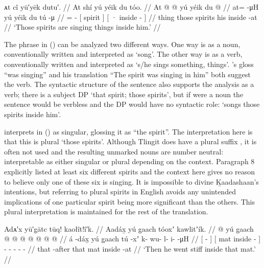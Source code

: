 \ex\label{ex:100-175-spirits-singing}%
%
\begingl
	\glpreamble	ᴀt cî yū′yēk dutu′. //
	\glpreamble	At shí yú yéik du tóo. //
	\gla	At @  @ {}
		{} yú yéik {}
		{} du  @ {} {} //
	\glb	at=  -μH
		{} yú yéik {} 
		{} du tú -μ {} //
	\glc	{}=  -\hspace{2em}
		{}[  spirit {}]
		{}[ · inside - {}] //
	\gld	thing  {}
		{} those spirits {}
		{} his inside -at {} //
	\glft	‘Those spirits are singing things inside him.’
		//
\endgl
\xe

The phrase  in (\lastx) can be analyzed two different ways.
One way is as a noun, conventionally written  and interpreted as ‘song’.
The other way is as a verb, conventionally written  and interpreted as ‘s/he sings something, things’.
\citeauthor{swanton:1909}’s gloss “was singing” and his translation “The spirit was singing in him” both suggest the verb.
The syntactic structure of the sentence also supports the analysis as a verb; there is a subject DP  ‘that spirit; those spirits’, but if  were a noun the sentence would be verbless and the DP would have no syntactic role: ‘songs those spirits inside him’.

\citeauthor{swanton:1909} interprets  in (\lastx) as singular, glossing it as “the spirit”.
The interpretation here is that this is plural ‘those spirits’.
Although Tlingit does have a plural suffix , it is often not used and the resulting unmarked nouns are number neutral: interpretable as either singular or plural depending on the context.
Paragraph 8 explicitly listed at least six different spirits and the context here gives no reason to believe only one of these six is singing.
It is impossible to divine Ḵaadashaan’s intentions, but referring to plural spirits in English avoids any unintended implications of one particular spirit being more significant than the others.
This plural interpretation is maintained for the rest of the translation. 

\ex\label{ex:100-176-went-stiff}%
%
\begingl
	\glpreamble	Adᴀ′x yū′g̣ātc tūq! kaołît!î′k. //
	\glpreamble	Aadáx̱ yú g̱aach tóoxʼ kawlitʼík. //
	\gla	{}  @ {} {}
		{} yú g̱aach  @ {} {}
		 @ {} @ {} @ {} @ {} @ {} @ {} //
	\glb	{} á -dáx̱ {}
		{} yú g̱aach tú -xʼ {} 
		k- wu- l- i-  -μH //
	\glc	{}[  - {}]
		{}[  mat inside - {}]
		- - - -  - //
	\gld	{} that -after {}
		{} that mat inside -at {}
		 {} {} {} {} {} //
	\glft	‘Then he went stiff inside that mat.’
		//
\endgl
\xe

